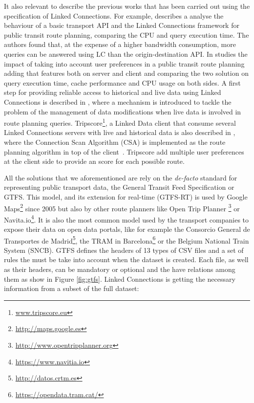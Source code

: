 \documentclass[sw]{iosart2x}
\begin{document}
It also relevant to describe the previous works that has been carried out using the specification of Linked Connections. For example, \cite{colpaert2017public} describes a analyse the behaviour of a basic transport API and the Linked Connections framework for public transit route planning, comparing the CPU and query execution time. The authors found that, at the expense of a higher bandwidth consumption, more queries can be answered using  LC than the origin-destination API. In \cite{colpaert2016impact} studies the impact of taking into account user preferences in a public transit route planning adding that features both on server and client and comparing the two solution on query execution time, cache performance and CPU usage on both sides. A first step for providing reliable access to historical and live data using Linked Connections is described in \cite{rojas2017providing}, where a mechanism is introduced to tackle the problem of the management of  data modifications when live data is involved in route planning queries. Tripscore\footnote{\url{www.tripscore.eu}}, a Linked Data client that consume several Linked Connections servers with live and historical data is also described in \cite{ChavesFragaEtAl:DeSemWeb2017}, where the Connection Scan Algorithm (CSA) is implemented as the route planning algorithm in top of the client~\cite{dibbelt2013intriguingly}. Tripscore add multiple user preferences at the client side to provide an score for each possible route. 

All the solutions that we aforementioned are rely on the \textit{de-facto} standard for representing public transport data, the General Transit Feed Specification or GTFS. This model, and its extension for real-time (GTFS-RT) is used by Google Maps\footnote{\url{http://maps.google.es}} since 2005 but also by other route planners like Open Trip Planner \footnote{\url{http://www.opentripplanner.org}} or  Navita.io\footnote{\url{https://www.navitia.io}}. It is also the most common model used by the transport companies to expose their data on open data portals, like for example the Consorcio General de Transportes de Madrid\footnote{\url{http://datos.crtm.es}}, the TRAM in Barcelona\footnote{\url{https://opendata.tram.cat/}} or the Belgium National Train System (SNCB). GTFS defines the headers of 13 types of CSV files and a set of rules the must be take into account when the dataset is created. Each file, as well as their headers, can be mandatory or optional and the have relations among them as show in Figure \ref{fig:gtfs}. Linked Connections is getting the necessary information from a subset of the full dataset:
\end{document}
